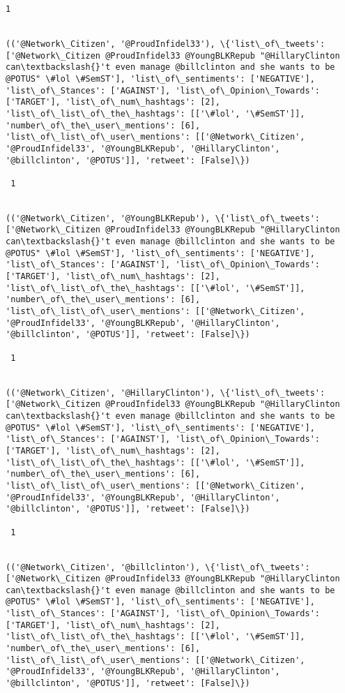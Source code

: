 \documentclass[11pt]{article}
\begin{document}
\begin{Verbatim}[commandchars=\\\{\}]
 1
 

(('@Network\_Citizen', '@ProudInfidel33'), \{'list\_of\_tweets': ['@Network\_Citizen @ProudInfidel33 @YoungBLKRepub "@HillaryClinton can\textbackslash{}'t even manage @billclinton and she wants to be @POTUS" \#lol \#SemST'], 'list\_of\_sentiments': ['NEGATIVE'], 'list\_of\_Stances': ['AGAINST'], 'list\_of\_Opinion\_Towards': ['TARGET'], 'list\_of\_num\_hashtags': [2], 'list\_of\_list\_of\_the\_hashtags': [['\#lol', '\#SemST']], 'number\_of\_the\_user\_mentions': [6], 'list\_of\_list\_of\_user\_mentions': [['@Network\_Citizen', '@ProudInfidel33', '@YoungBLKRepub', '@HillaryClinton', '@billclinton', '@POTUS']], 'retweet': [False]\})

 1
 

(('@Network\_Citizen', '@YoungBLKRepub'), \{'list\_of\_tweets': ['@Network\_Citizen @ProudInfidel33 @YoungBLKRepub "@HillaryClinton can\textbackslash{}'t even manage @billclinton and she wants to be @POTUS" \#lol \#SemST'], 'list\_of\_sentiments': ['NEGATIVE'], 'list\_of\_Stances': ['AGAINST'], 'list\_of\_Opinion\_Towards': ['TARGET'], 'list\_of\_num\_hashtags': [2], 'list\_of\_list\_of\_the\_hashtags': [['\#lol', '\#SemST']], 'number\_of\_the\_user\_mentions': [6], 'list\_of\_list\_of\_user\_mentions': [['@Network\_Citizen', '@ProudInfidel33', '@YoungBLKRepub', '@HillaryClinton', '@billclinton', '@POTUS']], 'retweet': [False]\})

 1
 

(('@Network\_Citizen', '@HillaryClinton'), \{'list\_of\_tweets': ['@Network\_Citizen @ProudInfidel33 @YoungBLKRepub "@HillaryClinton can\textbackslash{}'t even manage @billclinton and she wants to be @POTUS" \#lol \#SemST'], 'list\_of\_sentiments': ['NEGATIVE'], 'list\_of\_Stances': ['AGAINST'], 'list\_of\_Opinion\_Towards': ['TARGET'], 'list\_of\_num\_hashtags': [2], 'list\_of\_list\_of\_the\_hashtags': [['\#lol', '\#SemST']], 'number\_of\_the\_user\_mentions': [6], 'list\_of\_list\_of\_user\_mentions': [['@Network\_Citizen', '@ProudInfidel33', '@YoungBLKRepub', '@HillaryClinton', '@billclinton', '@POTUS']], 'retweet': [False]\})

 1
 

(('@Network\_Citizen', '@billclinton'), \{'list\_of\_tweets': ['@Network\_Citizen @ProudInfidel33 @YoungBLKRepub "@HillaryClinton can\textbackslash{}'t even manage @billclinton and she wants to be @POTUS" \#lol \#SemST'], 'list\_of\_sentiments': ['NEGATIVE'], 'list\_of\_Stances': ['AGAINST'], 'list\_of\_Opinion\_Towards': ['TARGET'], 'list\_of\_num\_hashtags': [2], 'list\_of\_list\_of\_the\_hashtags': [['\#lol', '\#SemST']], 'number\_of\_the\_user\_mentions': [6], 'list\_of\_list\_of\_user\_mentions': [['@Network\_Citizen', '@ProudInfidel33', '@YoungBLKRepub', '@HillaryClinton', '@billclinton', '@POTUS']], 'retweet': [False]\})


\end{Verbatim}
\end{document}
